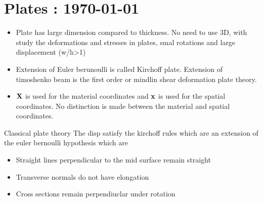 




	\tableofcontents


\section{Plates : \today}

	\begin{frame}
		\begin{itemize}
			\item Plate has large dimension compared to thickness. No need to use 3D, with study the deformations and stresses in plates, smal rotations and large displacement (w/h>1)
			\item Extension of Euler berunoulli is called Kirchoff plate. Extension of timoshenko beam is the first order or mindlin shear deformation plate theory.
			\item $\mathbf{X}$ is used for the material coordinates and $\mathbf{x}$ is used for the spatial coordinates. No distinction is made between the material and spatial coordinates. 	
		\end{itemize}
	\end{frame}


	\begin{frame}{Classical plate theory}
		The disp satisfy the kirchoff rules which are an extension of the euler bernoulli hypothesis which are
		\begin{itemize}
			\item Straight lines perpendicular to the mid surface remain straight
			\item Transverse normals do not have elongation
			\item Cross sections remain perpendiuclar under rotation
		\end{itemize}
	\end{frame}


